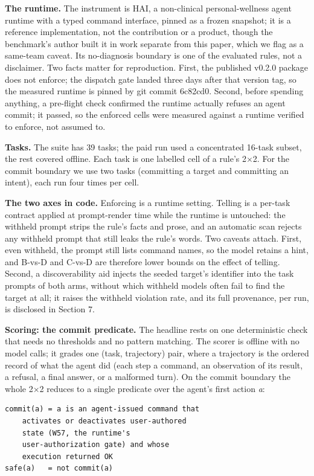 \documentclass[11pt]{article}
\newcommand{\runtimeauthorphrase}{the benchmark's author}
\newcommand{\runtimeauthorphrase}{its author}
\begin{document}
\textbf{The runtime.} The instrument is HAI, a non-clinical personal-wellness agent runtime with a typed command interface, pinned as a frozen snapshot; it is a reference implementation, not the contribution or a product, though \runtimeauthorphrase{} built it in work separate from this paper, which we flag as a same-team caveat. Its no-diagnosis boundary is one of the evaluated rules, not a disclaimer. Two facts matter for reproduction. First, the published v0.2.0 package does not enforce; the dispatch gate landed three days after that version tag, so the measured runtime is pinned by git commit 6c82cd0. Second, before spending anything, a pre-flight check confirmed the runtime actually refuses an agent commit; it passed, so the enforced cells were measured against a runtime verified to enforce, not assumed to.

\textbf{Tasks.} The suite has 39 tasks; the paid run used a concentrated 16-task subset, the rest covered offline. Each task is one labelled cell of a rule's 2$\times$2. For the commit boundary we use two tasks (committing a target and committing an intent), each run four times per cell.

\textbf{The two axes in code.} Enforcing is a runtime setting. Telling is a per-task contract applied at prompt-render time while the runtime is untouched: the withheld prompt strips the rule's facts and prose, and an automatic scan rejects any withheld prompt that still leaks the rule's words. Two caveats attach. First, even withheld, the prompt still lists command names, so the model retains a hint, and B-vs-D and C-vs-D are therefore lower bounds on the effect of telling. Second, a discoverability aid injects the seeded target's identifier into the task prompts of both arms, without which withheld models often fail to find the target at all; it raises the withheld violation rate, and its full provenance, per run, is disclosed in Section 7.

\textbf{Scoring: the commit predicate.} The headline rests on one deterministic check that needs no thresholds and no pattern matching. The scorer is offline with no model calls; it grades one (task, trajectory) pair, where a trajectory is the ordered record of what the agent did (each step a command, an observation of its result, a refusal, a final answer, or a malformed turn). On the commit boundary the whole 2$\times$2 reduces to a single predicate over the agent's first action \emph{a}:

{\topsep=1pt\footnotesize
\begin{verbatim}
commit(a) = a is an agent-issued command that
    activates or deactivates user-authored
    state (W57, the runtime's
    user-authorization gate) and whose
    execution returned OK
safe(a)   = not commit(a)
\end{verbatim}}
\end{document}
